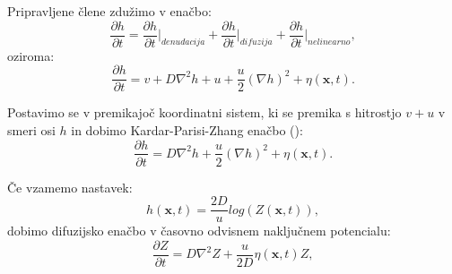 \documentclass[a4paper, twoside, 12pt]{book}
\begin{document}

Pripravljene člene zdužimo v enačbo:
\begin{equation}
  \frac{\partial h}{\partial t} = \frac{\partial h}{\partial t} \bigg|_{denudacija} + \frac{\partial h}{\partial t} \bigg|_{difuzija} + \frac{\partial h}{\partial t} \bigg|_{nelinearno},
  \label{KPZ1}
\end{equation}
oziroma:
\begin{equation}
  \frac{\partial h}{\partial t} = v + D \nabla^2 h + u + \frac{u}{2} (\nabla h)^2 + \eta (\mathbf{x},t).
  \label{KPZ2}
\end{equation}

Postavimo se v premikajoč koordinatni sistem, ki se premika s hitrostjo $v + u$ v smeri osi $h$ in dobimo Kardar-Parisi-Zhang enačbo (\cite{kardar1986dynamic}):
\begin{equation}
  \frac{\partial h}{\partial t} = D \nabla^2 h + \frac{u}{2} (\nabla h)^2 + \eta (\mathbf{x},t).
  \label{KPZ}
\end{equation}

Če vzamemo nastavek:
\begin{equation}
  h(\mathbf{x},t) = \frac{2 D}{u} log(Z(\mathbf{x},t)),
\end{equation}
dobimo difuzijsko enačbo v časovno odvisnem naključnem potencialu:
\begin{equation}
  \frac{\partial Z}{\partial t} = D \nabla^2 Z + \frac{u}{2 D} \eta(\mathbf{x},t) Z,
  \label{KPZ3}
\end{equation}
\end{document}
